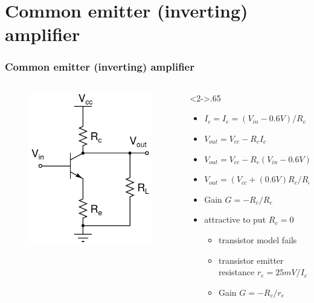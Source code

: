 \documentclass[beamer]{standalone}
\begin{document}
\section{Common emitter (inverting) amplifier}
\frame
{ \frametitle{Common emitter (inverting) amplifier}
\begin{columns}[c]
 \begin{column}{.35\textwidth}
  \begin{figure}
   \includegraphics[height=0.50\textheight]{./schematics/npn_common_emitter_amplifier}
  \end{figure}
 \end{column}
 \begin{column}<2->{.65\textwidth}
  \begin{itemize}
   \item $I_c=I_e=(V_{in}-0.6V)/R_e$  
   \item $V_{out}=V_{cc}-R_c I_c$
   \item $V_{out}=V_{cc}-R_c (V_{in}-0.6V)/R_e$
   \item $V_{out}=(V_{cc}+(0.6V) R_c/R_e) -V_{in} R_c/R_e$
   \item Gain $G=-R_c/R_e$
   \item attractive to put $R_e=0$
   \begin{itemize}
    \item transistor model fails
    \item transistor emitter resistance $r_e=25mV/I_c$
    \item Gain $G=-R_c/r_e$
   \end{itemize}
  \end{itemize}
 \end{column}
\end{columns}
 
 }
\end{document}
